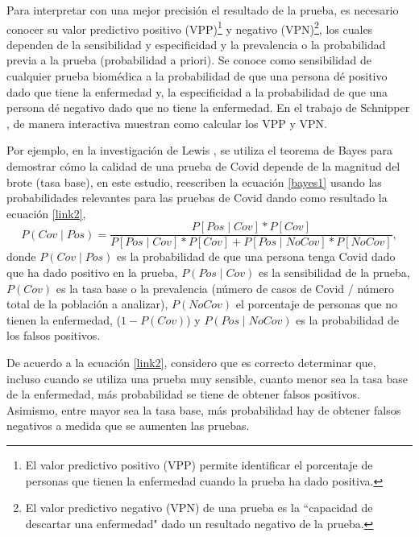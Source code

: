 \documentclass{article}
\begin{document}
Para interpretar con una mejor precisión el resultado de la prueba, es necesario conocer su valor predictivo positivo (VPP)\footnote{El valor predictivo positivo (VPP) permite identificar el porcentaje de personas que tienen la enfermedad cuando la prueba ha dado positiva.} y negativo (VPN)\footnote{El valor predictivo negativo (VPN) de una prueba es la ``capacidad de descartar una enfermedad" dado un resultado negativo de la prueba.}, los cuales dependen de la sensibilidad y especificidad y la prevalencia o la probabilidad previa a la prueba (probabilidad a priori). Se conoce como sensibilidad de cualquier prueba biomédica a la probabilidad de que una persona dé positivo dado que tiene la enfermedad y, la especificidad a la probabilidad de que una persona dé negativo dado que no tiene la enfermedad. En el trabajo de Schnipper \cite{link1}, de manera interactiva muestran como calcular los VPP y VPN.

Por ejemplo, en la investigación de Lewis \cite{link2}, se utiliza el teorema de Bayes para demostrar cómo la calidad de una prueba de Covid depende de la magnitud del brote (tasa base), en este estudio, reescriben la ecuación \ref{bayes1} usando las probabilidades relevantes para las pruebas de Covid dando como resultado la ecuación \ref{link2},
\begin{equation}
P(Cov \mid Pos)= \frac{P[Pos \mid Cov]*P[Cov]}{P[Pos \mid Cov]*P[Cov] + P[Pos \mid NoCov]*P[NoCov]},
\label{link2}
\end{equation}
\noindent donde $P(Cov \mid Pos)$ es la probabilidad de que una persona tenga Covid dado que ha dado positivo en la prueba, $P(Pos \mid Cov)$ es la sensibilidad de la prueba, $P(Cov)$ es la tasa base o la prevalencia (número de casos de Covid / número total de la población a analizar), $P(NoCov)$ el porcentaje de personas que no tienen la enfermedad, ($1-P(Cov)$) y $P(Pos \mid NoCov)$ es la probabilidad de los falsos positivos.

De acuerdo a la ecuación \ref{link2}, considero que es correcto determinar que, incluso cuando se utiliza una prueba muy sensible, cuanto menor sea la tasa base de la enfermedad, más probabilidad se tiene de obtener falsos positivos. Asimismo, entre mayor sea la tasa base, más probabilidad hay de obtener falsos negativos a medida que se aumenten las pruebas.
\end{document}
